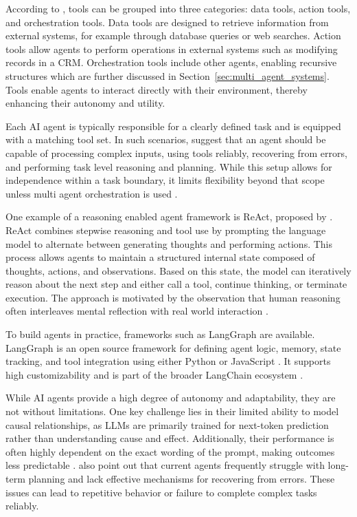 \documentclass[a4paper,oneside,bibliography=totoc]{scrbook}
\begin{document}
According to \citet{OpenAI2025}, tools can be grouped into three categories: data tools, action tools, and orchestration tools. Data tools are designed to retrieve information from external systems, for example through database queries or web searches. Action tools allow agents to perform operations in external systems such as modifying records in a \ac{CRM}. Orchestration tools include other agents, enabling recursive structures which are further discussed in Section~\ref{sec:multi_agent_systems}. Tools enable agents to interact directly with their environment, thereby enhancing their autonomy and utility.

Each \ac{AI} agent is typically responsible for a clearly defined task and is equipped with a matching tool set. In such scenarios, \citet{Anthropic2024} suggest that an agent should be capable of processing complex inputs, using tools reliably, recovering from errors, and performing task level reasoning and planning. While this setup allows for independence within a task boundary, it limits flexibility beyond that scope unless multi agent orchestration is used \cite{Sapkota2025}.

One example of a reasoning enabled agent framework is ReAct, proposed by \citet{Yao2023}. ReAct combines stepwise reasoning and tool use by prompting the language model to alternate between generating thoughts and performing actions. This process allows agents to maintain a structured internal state composed of thoughts, actions, and observations. Based on this state, the model can iteratively reason about the next step and either call a tool, continue thinking, or terminate execution. The approach is motivated by the observation that human reasoning often interleaves mental reflection with real world interaction \cite{Yao2023}.

To build agents in practice, frameworks such as LangGraph are available. LangGraph is an open source framework for defining agent logic, memory, state tracking, and tool integration using either Python or JavaScript \cite{LangChain2025}. It supports high customizability and is part of the broader LangChain ecosystem \cite{LangChain2025a}.

While \ac{AI} agents provide a high degree of autonomy and adaptability, they are not without limitations. One key challenge lies in their limited ability to model causal relationships, as \acp{LLM} are primarily trained for next-token prediction rather than understanding cause and effect. Additionally, their performance is often highly dependent on the exact wording of the prompt, making outcomes less predictable \cite{Sapkota2025}. \citet{Sapkota2025} also point out that current agents frequently struggle with long-term planning and lack effective mechanisms for recovering from errors. These issues can lead to repetitive behavior or failure to complete complex tasks reliably.
\end{document}
